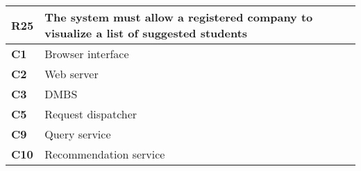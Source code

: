 \begin{table}[H]
    \centering
    \begin{tabular}{|l|m{10cm}|}
        \hline \textbf{R25} & The system must allow a registered company to visualize a list of suggested students \\
        \hline \textbf{C1} & Browser interface \\
        \hline \textbf{C2} & Web server \\
        \hline \textbf{C3} & DMBS \\
        \hline \textbf{C5} & Request dispatcher \\
        \hline \textbf{C9} & Query service \\
        \hline \textbf{C10} & Recommendation service \\
        \hline
    \end{tabular}
\end{table}

